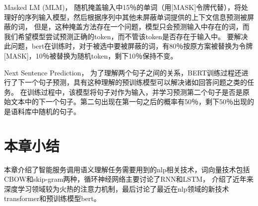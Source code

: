 Masked LM (MLM)，
随机掩盖输入中15％的单词（用[MASK]令牌代替），将处理好的序列输入模型，然后根据序列中其他未屏蔽单词提供的上下文信息预测被屏蔽的词，
但是，这种掩盖方法存在一个问题，模型只会预测输入中存在的词，而我们希望模型尝试预测正确的token，而不管该token是否存在于输入中。
要解决此问题，bert在训练时，对于被选中要被屏蔽的词，有80％按原方案被替换为令牌[MASK]，10％被替换为随机token，剩下10％保持不变。

Next Sentence Prediction，
为了理解两个句子之间的关系，BERT训练过程还进行了下一个句子预测，具有这种理解的预训练模型可以解决诸如回答问题之类的任务。
在训练过程中，该模型将句子对作为输入，并学习预测第二个句子是否是原始文本中的下一个句子。第二句出现在第一句之后的概率有50％，剩下50％出现的是语料库中随机的句子。

\section{本章小结}
本章介绍了智能服务调用语义理解任务需要用到的nlp相关技术，词向量技术包括CBOW和skip-gram两种，循环神经网络主要讨论了RNN和LSTM，
介绍了近年来深度学习领域较为火热的注意力机制，最后讨论了最近在nlp领域的新技术transformer和预训练模型bert。